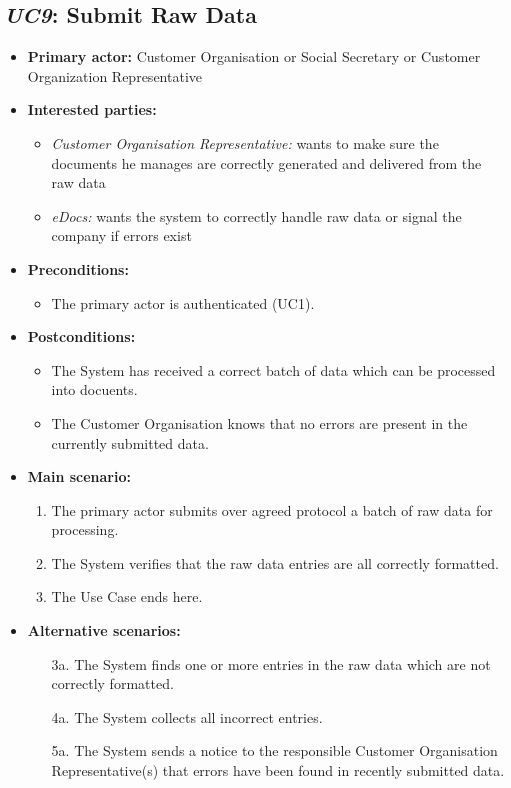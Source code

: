 \documentclass[a4paper,10pt]{article}
\begin{document}
\subsection{\emph{UC9}: Submit Raw Data}
\begin{itemize}
    \item \textbf{Primary actor:} Customer Organisation or Social Secretary or Customer Organization Representative
    \item \textbf{Interested parties:} 
        \begin{itemize}
            \item \textit{Customer Organisation Representative:} wants to make sure the documents he manages are correctly generated and delivered from the raw data
            \item \textit{eDocs:} wants the system to correctly handle raw data or signal the company if errors exist
        \end{itemize}

    \item \textbf{Preconditions:}
        \begin{itemize}
            \item The primary actor is authenticated (UC1).
        \end{itemize}

    \item \textbf{Postconditions:}
        \begin{itemize}
            \item The System has received a correct batch of data which can be processed into docuents.
            \item The Customer Organisation knows that no errors are present in the currently submitted data.
        \end{itemize}
        
    \item \textbf{Main scenario:} 
    \begin{enumerate}
       \item The primary actor submits over agreed protocol a batch of raw data for processing.
       \item The System verifies that the raw data entries are all correctly formatted.
       \item The Use Case ends here.
    \end{enumerate}

    \item \textbf{Alternative scenarios:} 
    \begin{enumerate}
        \item [3a.] The System finds one or more entries in the raw data which are not correctly formatted.
        \item [4a.] The System collects all incorrect entries.
        \item [5a.] The System sends a notice to the responsible Customer Organisation Representative(s) that errors have been found in recently submitted data.
    \end{enumerate}
    

\end{itemize}
\end{document}
